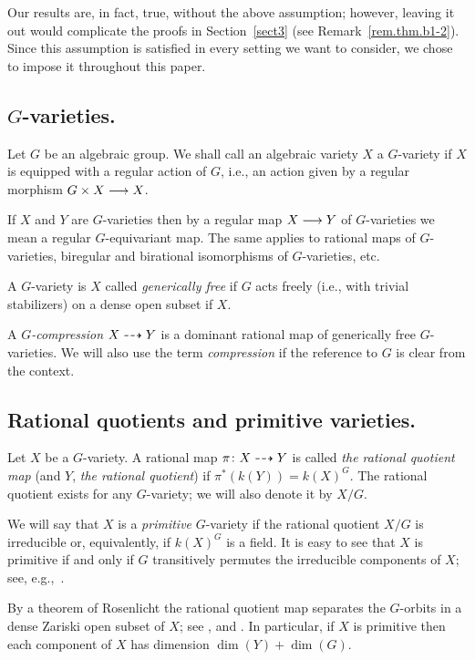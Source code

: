 Our results are, in fact, true, without the above assumption; however, 
leaving it out would complicate the proofs in Section~\ref{sect3} 
(see Remark~\ref{rem.thm.b1-2}). Since this assumption is satisfied 
in every setting we want to consider, we chose to impose it throughout
this paper.

\subsection{$G$-varieties.} \label{prel2}

Let $G$ be an algebraic group.
We shall call an algebraic variety $X$ a $G$-variety if
$X$ is equipped with a regular action of $G$, i.e., an action given by 
a regular morphism $G \times X \longrightarrow X$. 

If $X$ and $Y$ are $G$-varieties
then by a regular map $X \longrightarrow Y$ of $G$-varieties we mean a regular
$G$-equivariant map. The same applies to rational maps of $G$-varieties,
biregular and birational isomorphisms of $G$-varieties, etc.

A $G$-variety is $X$ called {\em generically free} if $G$ acts freely (i.e.,
with trivial stabilizers) on a dense open subset if $X$.

A {\em $G$-compression} $X \dasharrow Y$ is a dominant rational map of
generically free $G$-varieties. We will also use the term {\em compression}
if the reference to $G$ is clear from the context.

\subsection{Rational quotients and primitive varieties.} \label{prel4}
Let $X$ be a $G$-variety.
A rational map $\pi\colon X \dasharrow Y$ is called {\em the rational quotient 
map} (and $Y$, {\em the rational quotient}) if $\pi^{\ast} (k(Y)) = k(X)^G$.
The rational quotient exists for any $G$-variety; we 
will also denote it by $X/G$.

We will say that $X$ is a {\em primitive} $G$-variety if the rational
quotient $X/G$ is irreducible or, equivalently, if $k(X)^G$ is a field. 
It is easy to see that $X$ is primitive if and only if $G$ transitively
permutes the irreducible components of $X$; see, e.g.,~\cite[Lemma 2.2]{r2}.

By a theorem of Rosenlicht the rational quotient map separates
the $G$-orbits in a dense Zariski open subset of $X$; see 
\cite[Theorem 2]{rosenlicht1}, \cite[Theorem 2.3]{pv} and \cite{rosenlicht2}.
In particular, if $X$ is primitive then each component of $X$ has dimension 
$\dim(Y) + \dim(G)$.

